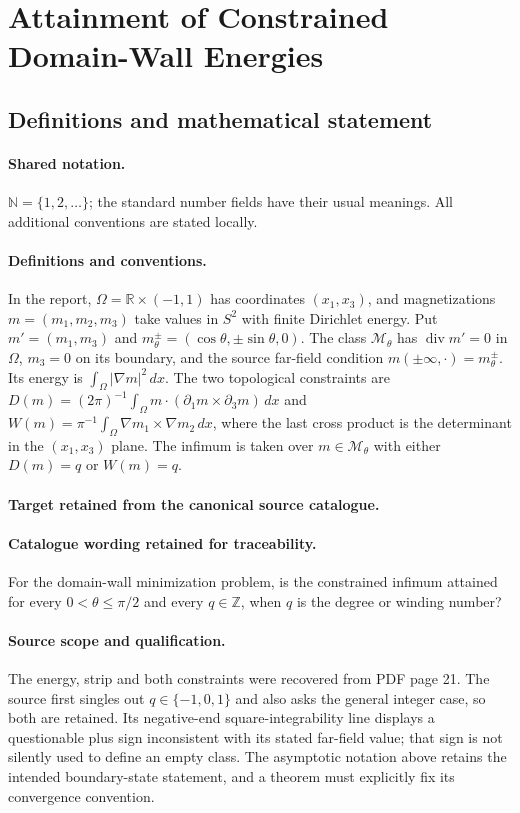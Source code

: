 \documentclass[11pt]{article}
\begin{document}
\section{Attainment of Constrained Domain-Wall Energies}\label{statement}

\subsection{Definitions and mathematical statement}

\paragraph{Shared notation.}$\mathbb N=\{1,2,\ldots\}$; the standard number fields have their usual meanings. All additional conventions are stated locally.


\paragraph{Definitions and conventions.}
In the report, $\Omega=\mathbb R\times(-1,1)$ has coordinates $(x_1,x_3)$, and magnetizations $m=(m_1,m_2,m_3)$ take values in $S^2$ with finite Dirichlet energy. Put $m'=(m_1,m_3)$ and $m_\theta^\pm=(\cos\theta,\pm\sin\theta,0)$. The class $\mathcal M_\theta$ has $\operatorname{div}m'=0$ in $\Omega$, $m_3=0$ on its boundary, and the source far-field condition $m(\pm\infty,\cdot)=m_\theta^\pm$. Its energy is $\int_\Omega|\nabla m|^2\,dx$. The two topological constraints are $D(m)=(2\pi)^{-1}\int_\Omega m\cdot(\partial_1m\times\partial_3m)\,dx$ and $W(m)=\pi^{-1}\int_\Omega\nabla m_1\times\nabla m_2\,dx$, where the last cross product is the determinant in the $(x_1,x_3)$ plane. The infimum is taken over $m\in\mathcal M_\theta$ with either $D(m)=q$ or $W(m)=q$.

\paragraph{Target retained from the canonical source catalogue.}
\paragraph{Catalogue wording retained for traceability.}
For the domain-wall minimization problem, is the constrained infimum attained for every $0<\theta\leq\pi/2$ and every $q\in\mathbb{Z}$, when $q$ is the degree or winding number?

\paragraph{Source scope and qualification.}
The energy, strip and both constraints were recovered from PDF page 21. The source first singles out $q\in\{-1,0,1\}$ and also asks the general integer case, so both are retained. Its negative-end square-integrability line displays a questionable plus sign inconsistent with its stated far-field value; that sign is not silently used to define an empty class. The asymptotic notation above retains the intended boundary-state statement, and a theorem must explicitly fix its convergence convention.
\end{document}
